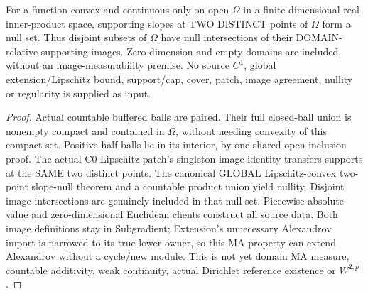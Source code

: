 \begin{lemma}
  \label{lem:domain-ma-overlap}
  \leanok
  For a function convex and continuous only on open $\Omega$ in a
  finite-dimensional real inner-product space, supporting slopes at TWO
  DISTINCT points of $\Omega$ form a null set. Thus disjoint subsets of
  $\Omega$ have null intersections of their DOMAIN-relative supporting images.
  Zero dimension and empty domains are included, without an image-measurability
  premise. No source $C^1$, global extension/Lipschitz bound, support/cap,
  cover, patch, image agreement, nullity or regularity is supplied as input.
\end{lemma}
\begin{proof}
  \leanok
  Actual countable buffered balls are paired. Their full closed-ball union is
  nonempty compact and contained in $\Omega$, without needing convexity of
  this compact set. Positive half-balls lie in its interior, by one shared
  open inclusion proof. The actual C0 Lipschitz patch's singleton image identity
  transfers supports at the SAME two distinct points. The canonical GLOBAL
  Lipschitz-convex two-point slope-null theorem and a countable product union
  yield nullity. Disjoint image intersections are genuinely included in that
  null set. Piecewise absolute-value and zero-dimensional Euclidean clients
  construct all source data. Both image definitions stay in Subgradient;
  Extension's unnecessary Alexandrov import is narrowed to its true lower
  owner, so this MA property can extend Alexandrov without a cycle/new module.
  This is not yet domain MA measure, countable additivity, weak continuity,
  actual Dirichlet reference existence or $W^{2,p}$.
\end{proof}

